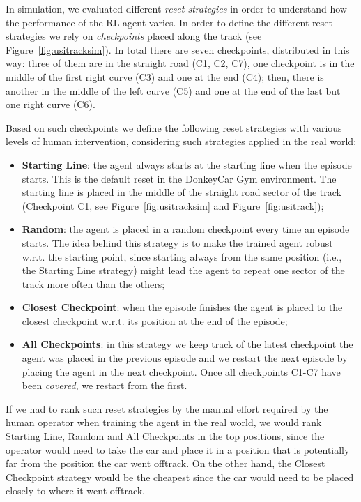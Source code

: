 In simulation, we evaluated different \textit{reset strategies} in order to understand how the performance of the RL agent varies. In order to define the different reset strategies we rely on \textit{checkpoints} placed along the track (see Figure~\ref{fig:usitracksim}). In total there are seven checkpoints, distributed in this way: three of them are in the straight road (C1, C2, C7), one checkpoint is in the middle of the first right curve (C3) and one at the end (C4); then, there is another in the middle of the left curve (C5) and one at the end of the last but one right curve (C6).

Based on such checkpoints we define the following reset strategies with various levels of human intervention, considering such strategies applied in the real world:

\begin{itemize}
	\item \textbf{Starting Line}: the agent always starts at the starting line when the episode starts. This is the default reset in the DonkeyCar Gym environment. The starting line is placed in the middle of the straight road sector of the track (Checkpoint C1, see Figure~\ref{fig:usitracksim} and Figure~\ref{fig:usitrack}); 
	\item \textbf{Random}: the agent is placed in a random checkpoint every time an episode starts. The idea behind this strategy is to make the trained agent robust w.r.t. the starting point, since starting always from the same position (i.e., the Starting Line strategy) might lead the agent to repeat one sector of the track more often than the others;
	\item \textbf{Closest Checkpoint}: when the episode finishes the agent is placed to the closest checkpoint w.r.t. its position at the end of the episode;
	\item \textbf{All Checkpoints}: in this strategy we keep track of the latest checkpoint the agent was placed in the previous episode and we restart the next episode by placing the agent in the next checkpoint. Once all checkpoints C1-C7 have been \textit{covered}, we restart from the first.
\end{itemize}

If we had to rank such reset strategies by the manual effort required by the human operator when training the agent in the real world, we would rank Starting Line, Random and All Checkpoints in the top positions, since the operator would need to take the car and place it in a position that is potentially far from the position the car went offtrack. On the other hand, the Closest Checkpoint strategy would be the cheapest since the car would need to be placed closely to where it went offtrack.

